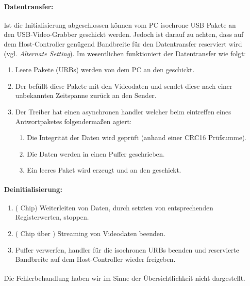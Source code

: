 \paragraph{Datentransfer:} Ist die Initialisierung abgeschlossen können vom PC isochrone USB Pakete an den USB-Video-Grabber
geschickt werden. Jedoch ist darauf zu achten, dass auf dem Host-Controller genügend Bandbreite für den Datentransfer reserviert wird
(vgl. \emph{Alternate Setting}). Im wesentlichen funktioniert der Datentransfer wie folgt:
\begin{enumerate}
 \item Leere Pakete (URBs) werden von dem PC an den \stk{} geschickt.
 \item Der \stk{} befüllt diese Pakete mit den Videodaten und sendet diese nach einer unbekannten Zeitspanne zurück an den Sender.
 \item Der Treiber hat einen asynchronen handler welcher beim eintreffen eines Antwortpaketes folgendermaßen agiert:
 \begin{enumerate}
  \item Die Integrität der Daten wird geprüft (anhand einer CRC16 Prüfsumme).
  \item Die Daten werden in einen Puffer geschrieben.
  \item Ein leeres Paket wird erzeugt und an den \stk{} geschickt. 
 \end{enumerate}
\end{enumerate}

\paragraph{Deinitialisierung:}
\begin{enumerate}
 \item (\stk{} Chip) Weiterleiten von Daten, durch setzten von entsprechenden Registerwerten, stoppen.
 \item (\saa{} Chip über \iic{}) Streaming von Videodaten beenden.
 \item Puffer verwerfen, handler für die isochronen URBs beenden und reservierte Bandbreite auf dem Host-Controller wieder freigeben.
\end{enumerate}

\paragraph{}
Die Fehlerbehandlung haben wir im Sinne der Übersichtlichkeit nicht dargestellt.


